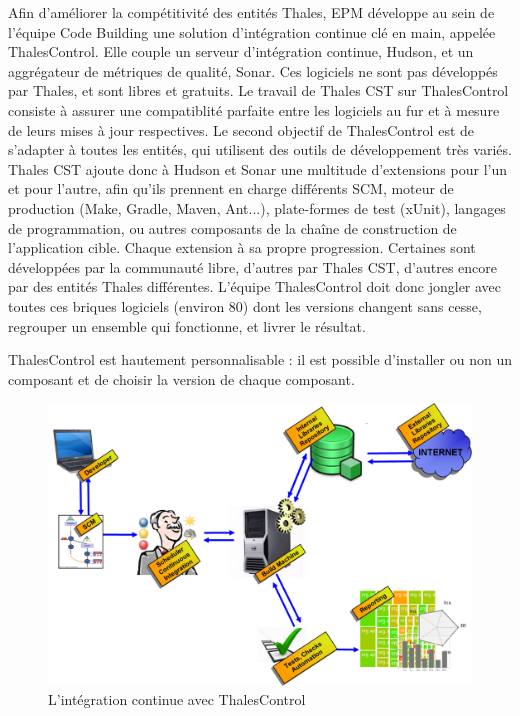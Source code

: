 Afin d'améliorer la compétitivité des entités Thales, EPM développe au sein 
de l'équipe Code Building une 
solution d'intégration continue clé en main, appelée ThalesControl. Elle couple 
un serveur d'intégration continue, Hudson, et un aggrégateur de métriques de 
qualité, Sonar. Ces logiciels ne sont pas développés par Thales, et sont 
libres et gratuits. Le travail de Thales CST sur ThalesControl consiste à assurer 
une compatiblité parfaite entre les logiciels au fur et à mesure de leurs
mises à jour respectives. Le second objectif de ThalesControl est de s'adapter
à toutes les entités, qui utilisent des outils de développement très variés. 
Thales CST ajoute donc à Hudson et Sonar une multitude d'extensions pour l'un et
pour l'autre, afin qu'ils prennent en charge différents SCM, moteur de 
production (Make, Gradle, Maven, Ant...), plate-formes de test (xUnit), langages
de programmation, ou autres composants de la chaîne de construction de 
l'application cible. Chaque extension à sa propre progression. Certaines sont 
développées par la communauté libre, d'autres par Thales CST, d'autres encore 
par des entités Thales différentes. L'équipe ThalesControl doit donc jongler 
avec toutes ces briques logiciels (environ 80) dont les versions changent 
sans cesse, regrouper un ensemble qui fonctionne, et livrer le résultat.

ThalesControl est hautement personnalisable : il est possible d'installer ou non
un composant et de choisir la version de chaque composant.

\begin{figure}[htb]
	\centering
	\includegraphics[scale=0.5]{continuous_integration_with_thales_control.png}
	\caption{L'intégration continue avec ThalesControl}
\end{figure}

